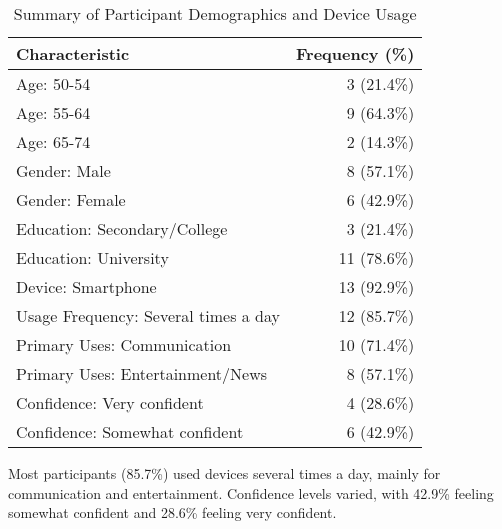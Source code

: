 \documentclass[acmlarge]{acmart}
\begin{document}
\begin{table}[h]
\centering
\caption{Summary of Participant Demographics and Device Usage}
\label{tab:demographics}
\begin{tabular}{lr}
\toprule
Characteristic & Frequency (\%) \\
\midrule
Age: 50-54 & 3 (21.4\%) \\
Age: 55-64 & 9 (64.3\%) \\
Age: 65-74 & 2 (14.3\%) \\
Gender: Male & 8 (57.1\%) \\
Gender: Female & 6 (42.9\%) \\
Education: Secondary/College & 3 (21.4\%) \\
Education: University & 11 (78.6\%) \\
Device: Smartphone & 13 (92.9\%) \\
Usage Frequency: Several times a day & 12 (85.7\%) \\
Primary Uses: Communication & 10 (71.4\%) \\
Primary Uses: Entertainment/News & 8 (57.1\%) \\
Confidence: Very confident & 4 (28.6\%) \\
Confidence: Somewhat confident & 6 (42.9\%) \\
\bottomrule
\end{tabular}
\end{table}

Most participants (85.7\%) used devices several times a day, mainly for communication and entertainment. Confidence levels varied, with 42.9\% feeling somewhat confident and 28.6\% feeling very confident.
\end{document}
